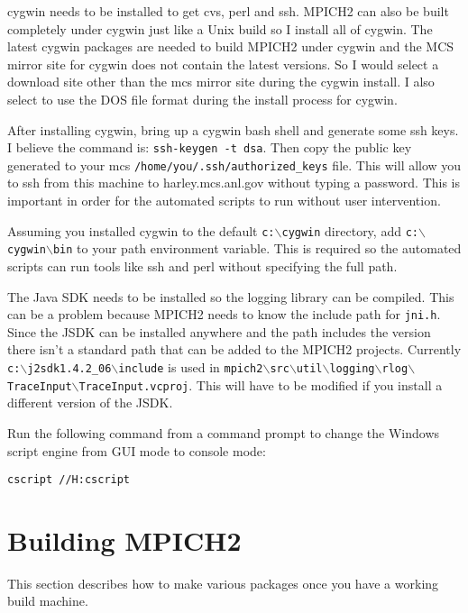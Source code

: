 \documentclass[dvipdfm,11pt]{article}
\begin{document}
cygwin needs to be installed to get cvs, perl and ssh.  MPICH2 can also be built completely
under cygwin just like a Unix build so I install all of cygwin.  The latest cygwin packages
are needed to build MPICH2 under cygwin and the MCS mirror site for cygwin does not contain
the latest versions.  So I would select a download site other than the mcs mirror site during
the cygwin install.  I also select to use the DOS file format during the install process for 
cygwin.

After installing cygwin, bring up a cygwin bash shell and generate some ssh keys.  I believe
the command is: \texttt{ssh-keygen -t dsa}.  Then copy the public key generated to your
mcs \texttt{/home/you/.ssh/authorized\_keys} file.  This will allow you to ssh from this machine
to harley.mcs.anl.gov without typing a password.  This is important in order for the 
automated scripts to run without user intervention.

Assuming you installed cygwin to the default \texttt{c:$\backslash$cygwin} directory, add 
\texttt{c:$\backslash$cygwin$\backslash$bin} to your path environment variable.  This is 
required so the automated scripts can run tools like ssh and perl without specifying the 
full path.

The Java SDK needs to be installed so the logging library can be compiled.  This can be a problem
because MPICH2 needs to know the include path for \texttt{jni.h}.  Since the JSDK can be installed anywhere
and the path includes the version there isn't a standard path that can be added to the MPICH2 
projects.  Currently \texttt{c:$\backslash$j2sdk1.4.2_06$\backslash$include} is used in
\texttt{mpich2$\backslash$src$\backslash$util$\backslash$logging$\backslash$rlog$\backslash$TraceInput$\backslash$TraceInput.vcproj}.
This will have to be modified if you install a different version of the JSDK.

Run the following command from a command prompt to change the Windows script engine from
GUI mode to console mode:
\begin{verbatim}
cscript //H:cscript
\end{verbatim}

\section{Building MPICH2}
\label{sec:building}

This section describes how to make various packages once you have a working build machine.
\end{document}
